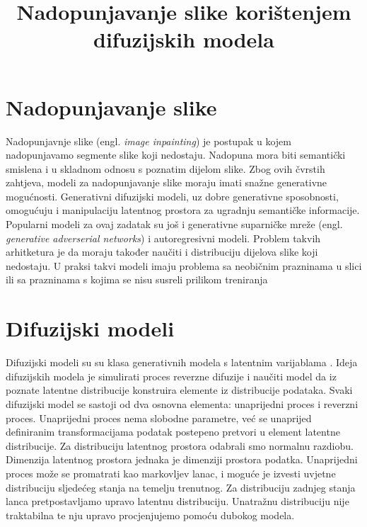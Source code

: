 \documentclass[10pt, a4paper, croatian]{article}
\title{Nadopunjavanje slike korištenjem difuzijskih modela}
\begin{document}
\maketitleabstract

\section{Nadopunjavanje slike}
Nadopunjavnje slike (engl. \emph{image inpainting}) je postupak u kojem nadopunjavamo segmente slike koji nedostaju. Nadopuna mora biti 
semantički smislena i u skladnom odnosu s poznatim dijelom slike. Zbog ovih čvrstih zahtjeva, modeli za nadopunjavanje slike moraju imati 
snažne generativne mogućnosti. Generativni difuzijski modeli, uz dobre generativne sposobnosti, omogućuju i manipulaciju latentnog prostora 
za ugradnju semantičke informacije. Popularni modeli za ovaj zadatak su još i generativne suparničke mreže 
(engl. \emph{generative adverserial networks}) i autoregresivni modeli. Problem takvih arhitketura je da moraju također naučiti i distribuciju
dijelova slike koji nedostaju. U praksi takvi modeli imaju problema sa neobičnim prazninama u slici ili sa prazninama s kojima se nisu
susreli prilikom treniranja


\section{Difuzijski modeli}
Difuzijski modeli su su klasa generativnih modela s latentnim varijablama \cite{diffusion}. Ideja difuzijskih modela je simulirati proces reverzne difuzije 
i naučiti model da iz poznate latentne distribucije konstruira elemente iz distribucije podataka. Svaki difuzijski model se sastoji od dva
osnovna elementa: unaprijedni proces i reverzni proces. Unaprijedni proces nema slobodne parametre, već se unaprijed definiranim 
transformacijama podatak postepeno pretvori u element latentne distribucije. Za distribuciju latentnog prostora odabrali smo normalnu razdiobu.
Dimenzija latentnog prostora jednaka je dimenziji prostora podatka. Unaprijedni proces može se promatrati kao markovljev lanac, i moguće je 
izvesti uvjetne distribuciju sljedećeg stanja na temelju trenutnog. Za distribuciju zadnjeg stanja lanca pretpostavljamo upravo latentnu 
distribuciju. Unatražnu distribuciju nije traktabilna te nju upravo procjenjujemo pomoću dubokog modela. 
\end{document}
